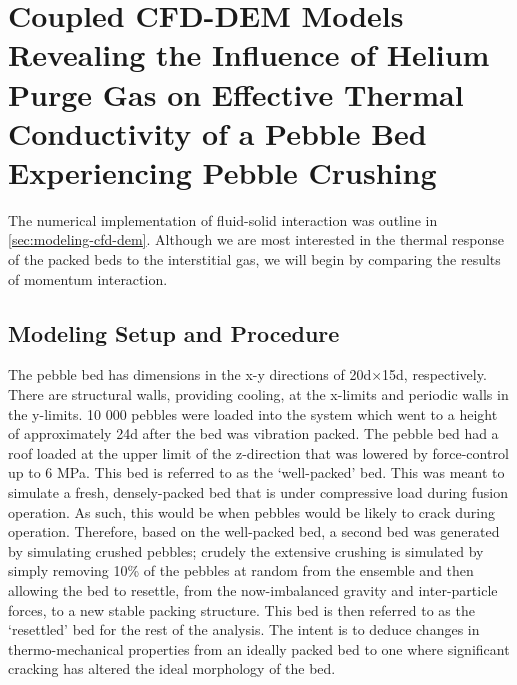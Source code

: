 \chapter{Coupled CFD-DEM Models Revealing the Influence of Helium Purge Gas on Effective Thermal Conductivity of a Pebble Bed Experiencing Pebble Crushing}\label{sec:cfd-dem-studies}
The numerical implementation of fluid-solid interaction was outline in \cref{sec:modeling-cfd-dem}. Although we are most interested in the thermal response of the packed beds to the interstitial gas, we will begin by comparing the results of momentum interaction.

\section{Modeling Setup and Procedure}
The pebble bed has dimensions in the x-y directions of 20d×15d, respectively. There are structural walls, providing cooling, at the x-limits and periodic walls in the y-limits. 10 000 pebbles were loaded into the system which went to a height of approximately 24d after the bed was vibration packed. The pebble bed had a roof loaded at the upper limit of the z-direction that was lowered by force-control up to 6 MPa. This bed is referred to as the ‘well-packed’ bed. This was meant to simulate a fresh, densely-packed bed that is under compressive load during fusion operation. As such, this would be when pebbles would be likely to crack during operation. Therefore, based on the well-packed bed, a second bed was generated by simulating crushed pebbles; crudely the extensive crushing is simulated by simply removing 10\% of the pebbles at random from the ensemble and then allowing the bed to resettle, from the now-imbalanced gravity and inter-particle forces, to a new stable packing structure. This bed is then referred to as the ‘resettled’ bed for the rest of the analysis. The intent is to deduce changes in thermo-mechanical properties from an ideally packed bed to one where significant cracking has altered the ideal morphology of the bed. 



